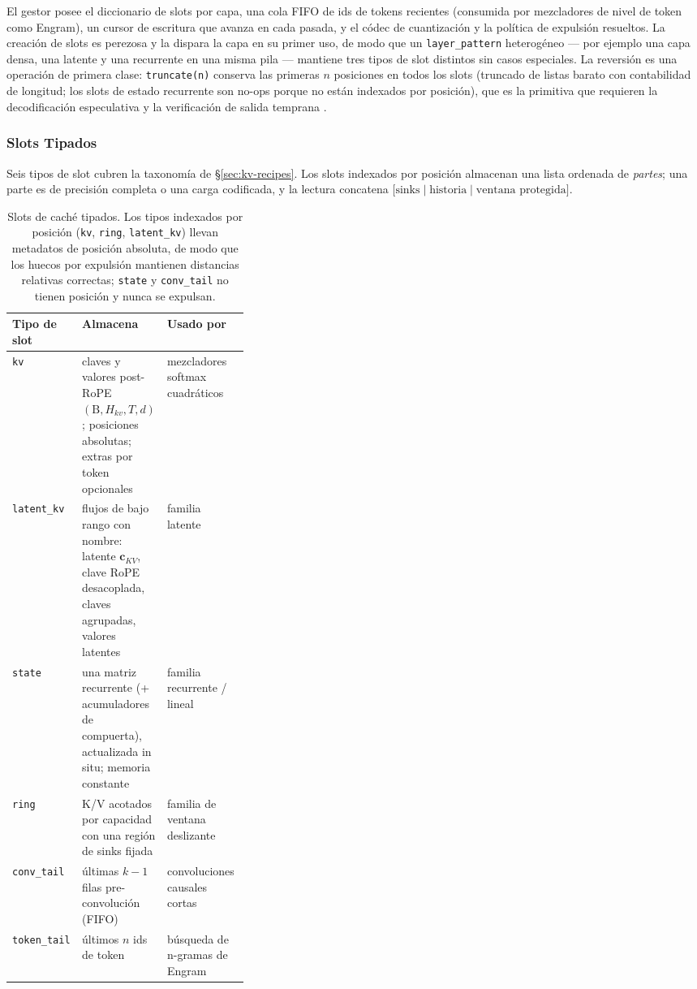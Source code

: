 El gestor posee el diccionario de slots por capa, una cola FIFO de ids de tokens recientes (consumida por mezcladores de nivel de token como Engram), un cursor de escritura que avanza en cada pasada, y el códec de cuantización y la política de expulsión resueltos. La creación de slots es perezosa y la dispara la capa en su primer uso, de modo que un \texttt{layer\_pattern} heterogéneo --- por ejemplo una capa densa, una latente y una recurrente en una misma pila --- mantiene tres tipos de slot distintos sin casos especiales. La reversión es una operación de primera clase: \texttt{truncate(n)} conserva las primeras $n$ posiciones en todos los slots (truncado de listas barato con contabilidad de longitud; los slots de estado recurrente son no-ops porque no están indexados por posición), que es la primitiva que requieren la decodificación especulativa y la verificación de salida temprana \citep{layerskip_elhoushi_2024}.

\subsubsection{Slots Tipados}

Seis tipos de slot cubren la taxonomía de \S\ref{sec:kv-recipes}. Los slots indexados por posición almacenan una lista ordenada de \emph{partes}; una parte es de precisión completa o una carga codificada, y la lectura concatena $\big[\text{sinks} \mid \text{historia} \mid \text{ventana protegida}\big]$.

\begin{table}[H]
\centering
\small
\begin{tabularx}{0.98\linewidth}{l L{0.34\linewidth} X}
\toprule
\textbf{Tipo de slot} & \textbf{Almacena} & \textbf{Usado por} \\
\midrule
\texttt{kv} & claves y valores post-RoPE $(\text{B},H_{kv},T,d)$; posiciones absolutas; extras por token opcionales & mezcladores softmax cuadráticos \\
\texttt{latent\_kv} & flujos de bajo rango con nombre: latente $\mathbf{c}_{KV}$, clave RoPE desacoplada, claves agrupadas, valores latentes & familia latente \\
\texttt{state} & una matriz recurrente (+ acumuladores de compuerta), actualizada in situ; memoria constante & familia recurrente / lineal \\
\texttt{ring} & K/V acotados por capacidad con una región de sinks fijada & familia de ventana deslizante \\
\texttt{conv\_tail} & últimas $k-1$ filas pre-convolución (FIFO) & convoluciones causales cortas \\
\texttt{token\_tail} & últimos $n$ ids de token & búsqueda de n-gramas de Engram \\
\bottomrule
\end{tabularx}
\caption{Slots de caché tipados. Los tipos indexados por posición (\texttt{kv}, \texttt{ring}, \texttt{latent\_kv}) llevan metadatos de posición absoluta, de modo que los huecos por expulsión mantienen distancias relativas correctas; \texttt{state} y \texttt{conv\_tail} no tienen posición y nunca se expulsan.}
\label{tab:kv-slots}
\end{table}


